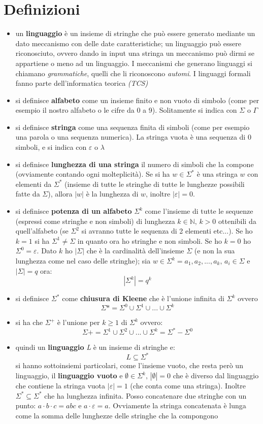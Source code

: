 \documentclass[a4paper,12pt, oneside]{book}
\begin{document}
\section{Definizioni}
\begin{itemize}
\item un \textbf{linguaggio }è un insieme di stringhe che può essere generato mediante un dato meccanismo con delle date caratteristiche; un linguaggio può essere riconosciuto, ovvero dando in input una stringa un meccanismo può dirmi se appartiene o meno ad un linguaggio. I meccanismi che generano linguaggi si chiamano \textit{grammatiche}, quelli che li riconoscono \textit{automi}. I linguaggi formali fanno parte dell'informatica teorica \textit{(TCS)}
\item si definisce \textbf{alfabeto} come un insieme finito e non vuoto di simbolo (come per esempio il nostro alfabeto o le cifre da 0 a 9). Solitamente si indica con $\Sigma$ o $\Gamma$
\item si definisce \textbf{stringa} come una sequenza finita di simboli (come per esempio una parola o una sequenza numerica). La stringa vuota è una sequenza di 0 simboli, e si indica con $\varepsilon$ o $\lambda$
\item si definisce \textbf{lunghezza di una stringa} il numero di simboli che la compone (ovviamente contando ogni molteplicità). Se si ha $w\in \Sigma^*$ è una stringa $w$ con elementi da $\Sigma^*$ (insieme di tutte le stringhe di tutte le lunghezze possibili fatte da $\Sigma$), allora $|w|$ è la lunghezza di $w$, inoltre $|\varepsilon|=0$.
\item si definisce \textbf{potenza di un alfabeto} $\Sigma^k$ come l'insieme di tutte le sequenze (espressi come stringhe e non simboli) di lunghezza $k\in\mathbb{N},\, k>0$ ottenibili da quell'alfabeto (se $\Sigma^2$ si avranno tutte le sequenza di 2 elementi etc...). Se ho $k=1$ si ha $\Sigma^1\neq \Sigma$ in quanto ora ho stringhe e non simboli. Se ho $k=0$ ho $\Sigma^0=\varepsilon$. Dato $k$ ho $|\Sigma|$ che è la cardinalità dell'insieme $\Sigma$ (e non la sua lunghezza come nel caso delle stringhe); sia $w\in\Sigma^k=a_1,a_2,...,a_k,\,a_i\in\Sigma$ e $|\Sigma|=q$ ora: $$|\Sigma^k|=q^k$$
\item si definisce $\Sigma^*$ come\textbf{ chiusura di Kleene} che è l'unione infinita di $\Sigma^k$ ovvero $$\Sigma*=\Sigma^0\cup \Sigma^1\cup...\cup \Sigma^k$$
\item si ha che $\Sigma^+$ è l'unione per $k\geq 1$ di $\Sigma^k$ ovvero:
$$\Sigma+=\Sigma^1\cup \Sigma^2\cup...\cup \Sigma^k= \Sigma^*-\Sigma^0$$
\item quindi un \textbf{linguaggio} \textit{L} è un insieme di stringhe e:
$$L\subseteq \Sigma^*$$ 
si hanno sottoinsiemi particolari, come l'insieme vuoto, che resta però un linguaggio, il \textbf{linguaggio vuoto} e $\emptyset\in\Sigma^k,\,|\emptyset|=0$ che è diverso dal linguaggio che contiene la stringa vuota $|\varepsilon|=1$ (che conta come una stringa). Inoltre $\Sigma^*\subseteq \Sigma^*$ che ha lunghezza infinita. Posso concatenare due stringhe con un punto: $a\cdot b\cdot c=abc$ e $a\cdot \varepsilon=a$. Ovviamente la stringa concatenata è lunga come la somma delle lunghezze delle stringhe che la compongono
\end{itemize}
\end{document}

